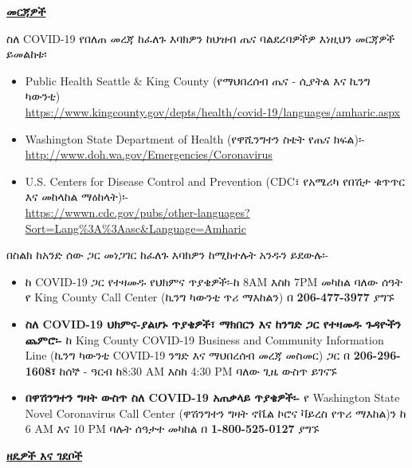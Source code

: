 \documentclass[10pt]{article}
\begin{document}
\bigskip

\large \underline{\textbf{መርጃዎች}}

ስለ COVID-19 የበለጠ መረጃ ከፈለጉ እባክዎን ከህዝብ ጤና ባልደረባዎችዎ እነዚህን መርጃዎች ይመልከቱ፡

\begin{itemize}
\item
  Public Health \textemdash Seattle \& King County (የማህበረሰብ ጤና - ሲያትል እና ኪንግ
  ካውንቲ)\\
  \url{https://www.kingcounty.gov/depts/health/covid-19/languages/amharic.aspx}

\item

  Washington State Department of Health (የዋሺንግተን ስቴት የጤና ክፍል)፡-\\
  \url{http://www.doh.wa.gov/Emergencies/Coronavirus}

\item
  U.S. Centers for Disease Control and Prevention (CDC፣ የአሜሪካ የበሽታ ቁጥጥር እና
  መከላከል ማዕከላት)፡-\\
  \url{https://wwwn.cdc.gov/pubs/other-languages?Sort=Lang%3A%3Aasc&Language=Amharic}

\end{itemize}

በስልክ ከአንድ ሰው ጋር መነጋገር ከፈለጉ እባክዎን ከሚከተሉት አንዱን ይደውሉ፡-

\begin{itemize}

\item

  ከ COVID-19 ጋር የተዛመዱ የህክምና ጥያቄዎች፡-ከ 8AM እስከ 7PM መካከል ባለው ሰዓት የ King County
  Call Center (ኪንግ ካውንቲ ጥሪ ማእከልን) በ \textbf{206-477-3977} ያግኙ

\item

  \textbf{ስለ COVID-19 ህክምና-ያልሆኑ ጥያቄዎች፣ ማክበርን እና ከንግድ ጋር የተዛመዱ ጉዳዮችን ጨምሮ፡-} ከ
  King County COVID-19 Business and Community Information Line (ኪንግ ካውንቲ
  COVID-19 ንግድ እና ማህበረሰብ መረጃ መስመር) ጋር በ \textbf{206-296-1608፣} ከሰኞ - ዓርብ ከ8:30
  AM እስከ 4:30 PM ባለው ጊዜ ውስጥ ይገናኙ

\item

  \textbf{በዋሽንግተን ግዛት ውስጥ ስለ COVID-19 አጠቃላይ ጥያቄዎች፡-} የ Washington State Novel
  Coronavirus Call Center (ዋሽንግተን ግዛት ኖቬል ኮሮና ቫይረስ የጥሪ ማእከል)ን ከ 6 AM እና 10 PM
  ባሉት ሰዓታተ መካከል በ \textbf{1-800-525-0127} ያግኙ

\end{itemize}

\bigskip

\large \underline{\textbf{ዘዴዎች እና ገደቦች}}
\end{document}
